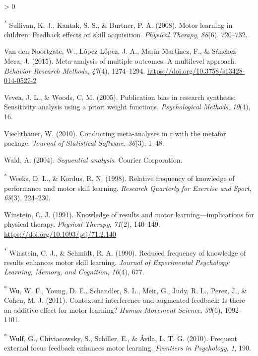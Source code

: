 \documentclass[
  english,
  man,mask,floatsintext]{apa7}
\newlength{\cslhangindent}
\newenvironment{CSLReferences}[2] %
 {%
  \setlength{\parindent}{0pt}
  \ifodd #1 \everypar{\setlength{\hangindent}{\cslhangindent}}\ignorespaces\fi
  \ifnum #2 > 0
  \setlength{\parskip}{#2\baselineskip}
  \fi
 }%
 {}
\begin{document}
\begin{CSLReferences}{1}{0}
\leavevmode\hypertarget{ref-Sullivan2008}{}%
\textsuperscript{*} Sullivan, K. J., Kantak, S. S., \& Burtner, P. A. (2008). Motor learning in children: Feedback effects on skill acquisition. \emph{Physical Therapy}, \emph{88}(6), 720--732.

\leavevmode\hypertarget{ref-VandenNoortgate2015}{}%
Van den Noortgate, W., López-López, J. A., Marín-Martínez, F., \& Sánchez-Meca, J. (2015). Meta-analysis of multiple outcomes: A multilevel approach. \emph{Behavior Research Methods}, \emph{47}(4), 1274--1294. \url{https://doi.org/10.3758/s13428-014-0527-2}

\leavevmode\hypertarget{ref-Vevea2005}{}%
Vevea, J. L., \& Woods, C. M. (2005). Publication bias in research synthesis: Sensitivity analysis using a priori weight functions. \emph{Psychological Methods}, \emph{10}(4), 16.

\leavevmode\hypertarget{ref-Viechtbauer2010}{}%
Viechtbauer, W. (2010). Conducting meta-analyses in r with the metafor package. \emph{Journal of Statistical Software}, \emph{36}(3), 1--48.

\leavevmode\hypertarget{ref-Wald2004}{}%
Wald, A. (2004). \emph{Sequential analysis}. Courier Corporation.

\leavevmode\hypertarget{ref-Weeks1998}{}%
\textsuperscript{*} Weeks, D. L., \& Kordus, R. N. (1998). Relative frequency of knowledge of performance and motor skill learning. \emph{Research Quarterly for Exercise and Sport}, \emph{69}(3), 224--230.

\leavevmode\hypertarget{ref-Winstein1991}{}%
Winstein, C. J. (1991). Knowledge of results and motor learning---implications for physical therapy. \emph{Physical Therapy}, \emph{71}(2), 140--149. \url{https://doi.org/10.1093/ptj/71.2.140}

\leavevmode\hypertarget{ref-Winstein1990}{}%
\textsuperscript{*} Winstein, C. J., \& Schmidt, R. A. (1990). Reduced frequency of knowledge of results enhances motor skill learning. \emph{Journal of Experimental Psychology: Learning, Memory, and Cognition}, \emph{16}(4), 677.

\leavevmode\hypertarget{ref-Wu2011}{}%
\textsuperscript{*} Wu, W. F., Young, D. E., Schandler, S. L., Meir, G., Judy, R. L., Perez, J., \& Cohen, M. J. (2011). Contextual interference and augmented feedback: Is there an additive effect for motor learning? \emph{Human Movement Science}, \emph{30}(6), 1092--1101.

\leavevmode\hypertarget{ref-Wulf2010}{}%
\textsuperscript{*} Wulf, G., Chiviacowsky, S., Schiller, E., \& Ávila, L. T. G. (2010). Frequent external focus feedback enhances motor learning. \emph{Frontiers in Psychology}, \emph{1}, 190.


\end{CSLReferences}
\end{document}
